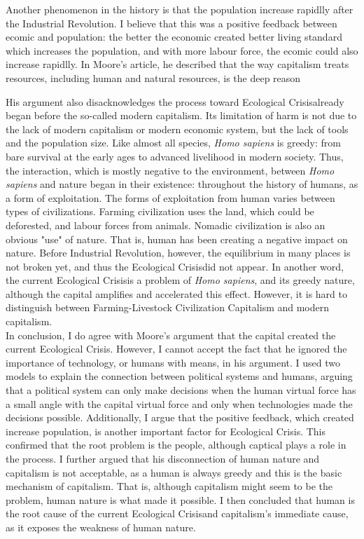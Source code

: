 \documentclass[12pt]{article}
\newcommand{\IR}{Industrial Revolution}
\newcommand{\EC}{Ecological Crisis}
\begin{document}
\begin{flushleft}
Another phenomenon in the history is that the population increase rapidlly after the \IR. I believe that this was a positive feedback between ecomic and population: the better the economic created better living standard which increases the population, and with more labour force, the ecomic could also increase rapidlly. In Moore's article, he described that the way capitalism treats resources, including human and natural resources, is the deep reason 



His argument also disacknowledges the process toward \EC already began before the  so-called modern capitalism.
Its limitation of harm is not due to the lack of modern capitalism or modern economic system, but the lack of tools and the population size. 
Like almost all species, \textit{Homo sapiens} is greedy: from bare survival at the early ages to advanced livelihood in modern society. Thus, the interaction, which is mostly negative to the environment, between \textit{Homo sapiens} and nature began in their existence: throughout the history of humans, as a form of exploitation. The forms of exploitation from human varies between types of civilizations. Farming civilization uses the land, which could be deforested, and labour forces from animals. Nomadic civilization is also an obvious "use" of nature. That is, human has been creating a negative impact on nature. Before \IR, however, the equilibrium in many places is not broken yet, and thus the \EC did not appear. In another word, the current \EC is a problem of \textit{Homo sapiens}, and its greedy nature, although the capital amplifies and accelerated this effect. However, it is hard to distinguish between Farming-Livestock Civilization Capitalism and modern capitalism.
\\



In conclusion, I do agree with Moore's argument that the capital created the current \EC. However, I cannot accept the fact that he ignored the importance of technology, or humans with means, in his argument. I used two models to explain the connection between political systems and humans, arguing that a political system can only make decisions when the human virtual force has a small angle with the capital virtual force and only when technologies made the decisions possible. Additionally, I argue that the positive feedback, which created increase population, is another important factor for \EC. This confirmed that the root problem is the people, although captical plays a role in the process. I further argued that his disconnection of human nature and capitalism is not acceptable, as a human is always greedy and this is the basic mechanism of capitalism. That is, although capitalism might seem to be the problem, human nature is what made it possible. I then concluded that human is the root cause of the current \EC and capitalism's immediate cause, as it exposes the weakness of human nature. 
\newpage




\end{flushleft}
\end{document}
